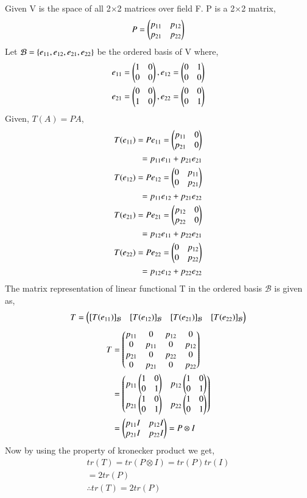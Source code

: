 Given V is the space of all 2$\times$2 matrices over field F. P is a 2$\times$2 matrix, 
\begin{align}
    P = \begin{pmatrix}p_{11}&p_{12}\\ p_{21}&p_{22}\end{pmatrix}
\end{align}
Let $\mathcal{B}=\left\{e_{11}, e_{12}, e_{21}, e_{22}\right\}$ be the ordered basis of V where, 
\begin{align}
    e_{11}=\begin{pmatrix}1&0\\0&0\end{pmatrix}, e_{12}=\begin{pmatrix}0&1\\0&0\end{pmatrix}\\
    e_{21}=\begin{pmatrix}0&0\\1&0\end{pmatrix}, e_{22}=\begin{pmatrix}0&0\\0&1\end{pmatrix}
\end{align}
Given, $T(A)=PA$, 
\begin{align}
    T(e_{11}) = Pe_{11}
    = \begin{pmatrix}p_{11}&0\\p_{21}&0\end{pmatrix} \\
    = p_{11}e_{11} + p_{21}e_{21} \\
    T(e_{12}) = Pe_{12} = \begin{pmatrix}0&p_{11}\\0&p_{21}\end{pmatrix}\\
    = p_{11}e_{12} + p_{21}e_{22} \\
    T(e_{21}) = Pe_{21} = 
    \begin{pmatrix}p_{12}&0\\p_{22}&0\end{pmatrix}\\
    = p_{12}e_{11} + p_{22}e_{21} \\
    T(e_{22}) = Pe_{22} = 
    \begin{pmatrix}0&p_{12}\\0&p_{22}\end{pmatrix} \\
    = p_{12}e_{12} + p_{22}e_{22}
\end{align}
The matrix representation of linear functional T in the ordered basis $\mathcal{B}$ is given as,
\begin{align}
    T = \begin{pmatrix}[T(e_{11})]_{\mathcal{B}} & [T(e_{12})]_{\mathcal{B}} & [T(e_{21})]_{\mathcal{B}} & [T(e_{22})]_{\mathcal{B}}\end{pmatrix}
\end{align}
\begin{align}
    T &= \begin{pmatrix}p_{11}&0&p_{12}&0\\0&p_{11}&0&p_{12}\\p_{21}&0&p_{22}&0\\0&p_{21}&0&p_{22}\end{pmatrix} \\
    &= \begin{pmatrix}p_{11}\begin{pmatrix}1&0\\0&1\end{pmatrix} & p_{12}\begin{pmatrix}1&0\\0&1\end{pmatrix} \\ p_{21}\begin{pmatrix}1&0\\0&1\end{pmatrix} & p_{22}\begin{pmatrix}1&0\\0&1\end{pmatrix}\end{pmatrix} \\
    &= \begin{pmatrix}p_{11}I & p_{12}I \\ p_{21}I & p_{22}I\end{pmatrix} = P \otimes I
\end{align}
Now by using the property of kronecker product we get, 
\begin{align}
    tr(T) = tr(P\otimes I)
    = tr(P)tr(I)\\
    = 2tr(P) \\
    \therefore tr(T)= 2tr(P)
\end{align}


